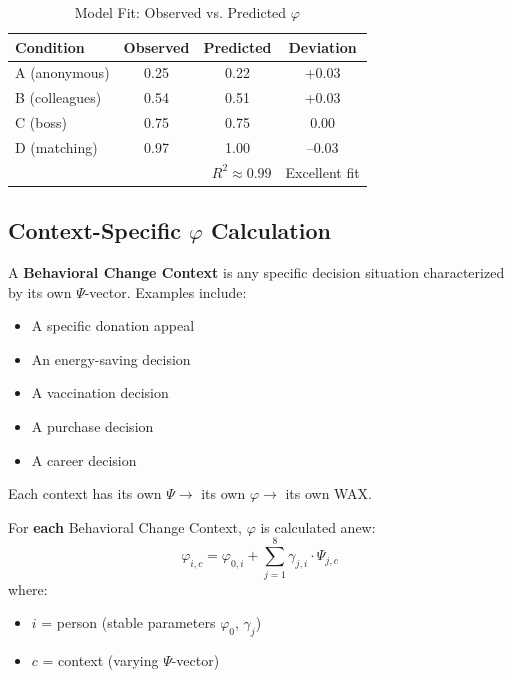 \begin{table}[htbp]
\centering
\caption{Model Fit: Observed vs. Predicted $\varphi$}
\begin{tabular}{@{}lccc@{}}
\toprule
\textbf{Condition} & \textbf{Observed} & \textbf{Predicted} & \textbf{Deviation} \\
\midrule
A (anonymous) & 0.25 & 0.22 & +0.03 \\
B (colleagues) & 0.54 & 0.51 & +0.03 \\
C (boss) & 0.75 & 0.75 & 0.00 \\
D (matching) & 0.97 & 1.00 & --0.03 \\
\midrule
\multicolumn{3}{r}{$R^2 \approx 0.99$} & Excellent fit \\
\bottomrule
\end{tabular}
\end{table}


\subsection{Context-Specific $\varphi$ Calculation}
\label{sec:phi-per-context}

\begin{definition}
\label{def:bc-context}
A \textbf{Behavioral Change Context} is any specific decision situation characterized by its own $\Psi$-vector. Examples include:
\begin{itemize}
\item A specific donation appeal
\item An energy-saving decision
\item A vaccination decision
\item A purchase decision
\item A career decision
\end{itemize}
Each context has its own $\Psi \rightarrow$ its own $\varphi \rightarrow$ its own WAX.
\end{definition}

\begin{definition}
\label{def:phi-per-context}
For \textbf{each} Behavioral Change Context, $\varphi$ is calculated anew:
\begin{equation}
\varphi_{i,c} = \varphi_{0,i} + \sum_{j=1}^{8} \gamma_{j,i} \cdot \Psi_{j,c}
\end{equation}
where:
\begin{itemize}
\item $i$ = person (stable parameters $\varphi_0$, $\gamma_j$)
\item $c$ = context (varying $\Psi$-vector)
\end{itemize}
\end{definition}

